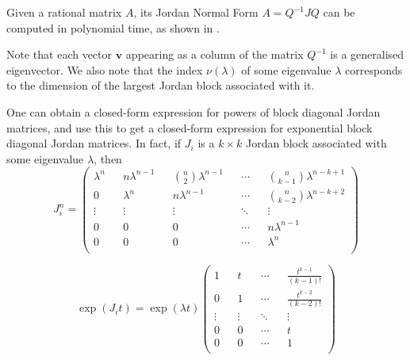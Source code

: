 Given a rational matrix $A$, its Jordan Normal Form $A=Q^{-1}JQ$ can be
computed in polynomial time, as shown in \cite{Cai94}.

Note that each vector $\boldsymbol{v}$ appearing as a column of the
matrix $Q^{-1}$ is a generalised eigenvector. We also note that the
index $\nu(\lambda)$ of some eigenvalue $\lambda$ corresponds to the
dimension of the largest Jordan block associated with it.

One can obtain a closed-form expression for powers of block diagonal
Jordan matrices, and use this to get a closed-form expression for
exponential block diagonal Jordan matrices. In fact, if $J_{i}$ is a
$k\times k$ Jordan block associated with some eigenvalue $\lambda$,
then
\noindent
\begin{equation*}
J_{i}^{n}=\begin{pmatrix}
\lambda^{n}	&&	n\lambda^{n-1}	&&	{n\choose 2}\lambda^{n-1}	&&
\cdots		&&	{n\choose k-1}\lambda^{n-k+1}				\\
0			&&	\lambda^{n}		&&	n\lambda^{n-1}				&&
\cdots		&&	{n\choose k-2}\lambda^{n-k+2}				\\
\vdots	&&	\vdots	&&	\vdots	&&	\ddots	&&	\vdots			\\
0		&&	0		&&	0		&&	\cdots	&&	n\lambda^{n-1}	\\
0		&&	0		&&	0		&&	\cdots	&&	\lambda^{n}		\\
\end{pmatrix}
\end{equation*}

\begin{equation*}
\exp(J_{i}t)=\exp(\lambda t) \begin{pmatrix}
1		&&	t		&&	\cdots	&&	\frac{t^{k-1}}{(k-1)!}	\\
0		&&	1		&&	\cdots	&&	\frac{t^{k-2}}{(k-2)!}	\\
\vdots	&&	\vdots	&&	\ddots	&&	\vdots						\\
0		&&	0		&&	\cdots	&&	t							\\
0		&&	0		&&	\cdots	&&	1							\\
\end{pmatrix}
\end{equation*}

